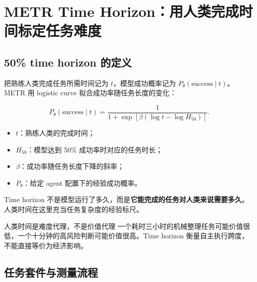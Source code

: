 \section{METR Time Horizon：用人类完成时间标定任务难度}

\subsection{50\% time horizon 的定义}


把熟练人类完成任务所需时间记为 $t$，模型成功概率记为 $P_\theta(\text{success}\mid t)$。METR 用 logistic curve 拟合成功率随任务长度的变化：

$$
P_\theta(\text{success}\mid t)=
\frac{1}{1+\exp\left[\beta\left(\log t-\log H_{50}\right)\right]}.
$$

\begin{itemize}
    \item $t$：熟练人类的完成时间；
    \item $H_{50}$：模型达到 50\% 成功率时对应的任务时长；
    \item $\beta$：成功率随任务长度下降的斜率；
    \item $P_\theta$：给定 agent 配置下的经验成功概率。
\end{itemize}

Time horizon 不是模型运行了多久，而是\textbf{它能完成的任务对人类来说需要多久}。人类时间在这里充当任务复杂度的经验标尺。

\begin{importantbox}{人类时间是难度代理，不是价值代理}
一个耗时三小时的机械整理任务可能价值很低，一个十分钟的高风险判断可能价值很高。Time horizon 衡量自主执行跨度，不能直接等价为经济影响。
\end{importantbox}

\subsection{任务套件与测量流程}



